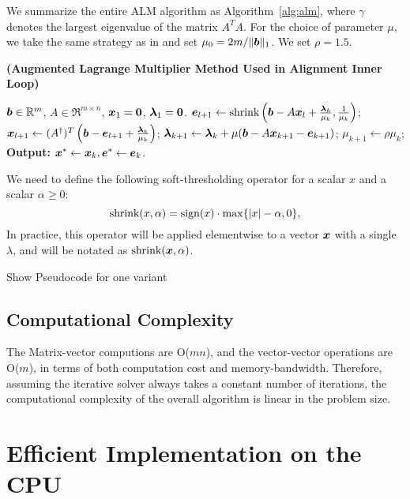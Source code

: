 \documentclass[10pt,twocolumn,letterpaper]{article}
\begin{document}
We summarize the entire ALM
algorithm as Algorithm~\ref{alg:alm}, where $\gamma$ denotes the
largest eigenvalue of the matrix $A^TA$. For the choice of parameter $\mu$, we take the same strategy as
in \cite{YangJ2009-pp} and set $\mu_0 = 2m / \|\boldsymbol{b}\|_1$. We set $\rho=1.5$.
\begin{algorithm}[h]
\caption{\bf (Augmented Lagrange Multiplier Method Used in Alignment Inner Loop)}
\begin{algorithmic}[1]
 $\boldsymbol{b} \in \mathbb R^m$, $A \in \Re^{m \times n}$,
${\boldsymbol{x}}_1 = \boldsymbol{0}$, $\boldsymbol{\lambda}_1 = \boldsymbol{0}$.
\STATE $\boldsymbol{e}_{l+1} \leftarrow \textup{shrink}\left(\boldsymbol{b} - A{\boldsymbol{x}}_l + \frac{\boldsymbol{\lambda}_k}{\mu_k}, \frac{1}{\mu_k}\right)$;
\STATE ${\boldsymbol{x}}_{l+1} \leftarrow (A^\dagger)^T \left(\boldsymbol{b} - \boldsymbol{e}_{l+1} + \frac{\boldsymbol{\lambda}_k}{\mu_k} \right) $;
\ENDWHILE
\STATE $\boldsymbol{\lambda}_{k+1} \leftarrow \boldsymbol{\lambda}_k + \mu (\boldsymbol{b} - A{\boldsymbol{x}}_{k+1} - \boldsymbol{e}_{k+1})$;
\STATE $\mu_{k+1} \leftarrow \rho\mu_k$;
\ENDWHILE \STATE
{\bf Output:} ${\boldsymbol{x}}^* \leftarrow {\boldsymbol{x}}_k, \boldsymbol{e}^* \leftarrow \boldsymbol{e}_k$.
\end{algorithmic}
\label{alg:alm}
\end{algorithm}



We need to define the following soft-thresholding operator for a
scalar $x$ and a scalar $\alpha \geq 0$:
\begin{equation}
\textup{shrink}(x,\alpha) = \textup{sign}(x)\cdot \max \{|x| - \alpha, 0\},
\end{equation}
In practice, this operator will be applied elementwise to a vector ${\boldsymbol{x}}$ with a single $\lambda$,
and will be notated as $\textup{shrink}({\boldsymbol{x}},\alpha)$.

Show Pseudocode for one variant
\subsection{Computational Complexity}
The Matrix-vector computions are O($mn$), and the vector-vector operations are O($m$), 
in terms of both computation cost and memory-bandwidth.
Therefore, assuming the iterative solver always takes a constant number of iterations,
the computational complexity of the overall algorithm is linear in the problem size.

\section{Efficient Implementation on the CPU}
\end{document}
